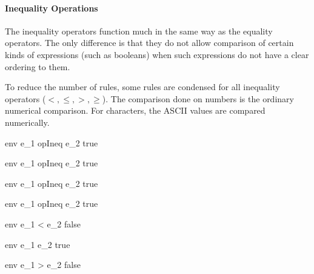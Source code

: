 \documentclass{article}
\begin{document}
\bigskip

\paragraph{Inequality Operations}
The inequality operators function much in the same way as the equality operators.
The only difference is that they do not allow comparison of certain kinds of expressions (such as booleans) when such expressions do not have a clear ordering to them.

To reduce the number of rules, some rules are condensed for all inequality operators ($<, \leq, >, \geq$).
The comparison done on numbers is the ordinary numerical comparison.
For characters, the ASCII values are compared numerically.

    {\mbox{env} \vdash e_1 \; opIneq \; e_2 \Downarrow true}

    {\mbox{env} \vdash e_1 \; opIneq \; e_2 \Downarrow true}

\medskip

    {\mbox{env} \vdash e_1 \; opIneq \; e_2 \Downarrow true}

    {\mbox{env} \vdash e_1 \; opIneq \; e_2 \Downarrow true}

\medskip

    {\mbox{env} \vdash e_1 < e_2 \Downarrow false}

    {\mbox{env} \vdash e_1 \leq e_2 \Downarrow true}

    {\mbox{env} \vdash e_1 > e_2 \Downarrow false}
\end{document}
